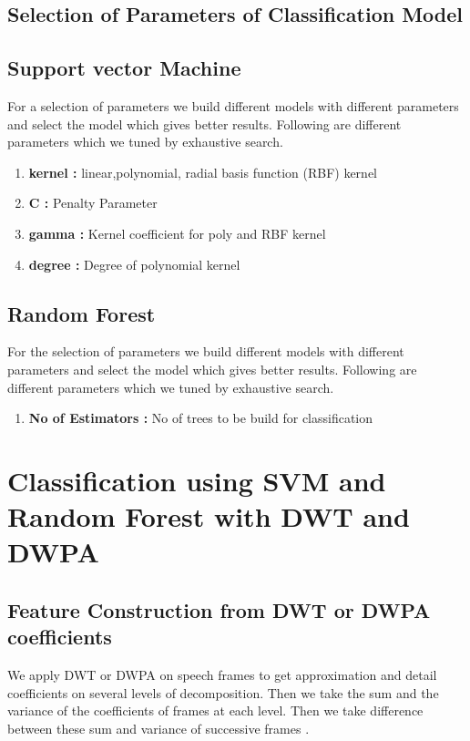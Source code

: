 \documentclass[11pt]{report}
\begin{document}
\subsection{Selection of Parameters of Classification Model}
\subsection{Support vector Machine}
For a selection of parameters we build different models with different parameters and select the model which gives better results. Following are different parameters which we tuned by exhaustive search.
\begin{enumerate}
\item \textbf{kernel :} linear,polynomial, radial basis function (RBF) kernel
\item \textbf{C :} Penalty Parameter 
\item \textbf{gamma :} Kernel coefficient for poly and RBF kernel
\item \textbf{degree :} Degree of polynomial kernel
\end{enumerate}

\subsection{Random Forest}
For the selection of parameters we build different models with different parameters and select the model which gives better results. Following are different parameters which we tuned by exhaustive search.
\begin{enumerate}
\item \textbf{No of Estimators :} No of trees to be build for classification
\end{enumerate}
 


\section{Classification using SVM and Random Forest with DWT and DWPA} 
\subsection{Feature Construction from DWT or DWPA coefficients}
We apply DWT or DWPA on speech frames to get approximation and detail coefficients on several levels of decomposition. Then we take the sum and the variance of the coefficients of frames at each level. Then we take difference between these sum and variance of successive frames \cite{ad}.
\end{document}
